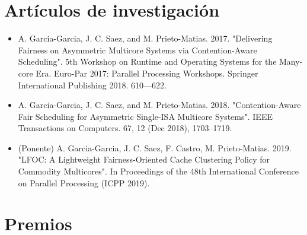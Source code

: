 \documentclass[10pt,a4paper,sans]{moderncv}        %
\begin{document}
\section{Artículos de investigación}
\begin{itemize}
\item A. Garcia-Garcia, J. C. Saez, and M. Prieto-Matias. 2017. "Delivering Fairness on Asymmetric Multicore Systems via Contention-Aware Scheduling". 5th Workshop on Runtime and Operating Systems for the Many-core Era. Euro-Par 2017: Parallel Processing Workshops. Springer International Publishing 2018. 610—622.
\smallskip
\item A. Garcia-Garcia, J. C. Saez, and M. Prieto-Matias. 2018. "Contention-Aware Fair Scheduling for Asymmetric Single-ISA Multicore Systems". IEEE Transactions on Computers. 67, 12 (Dec 2018), 1703–1719.
\smallskip
\item (Ponente) A. Garcia-Garcia, J. C. Saez, F. Castro, M. Prieto-Matias. 2019. "LFOC: A Lightweight Fairness-Oriented Cache Clustering Policy for Commodity Multicores". In Proceedings of the 48th International Conference on Parallel Processing (ICPP 2019).
\end{itemize}

\section{Premios}
\end{document}
